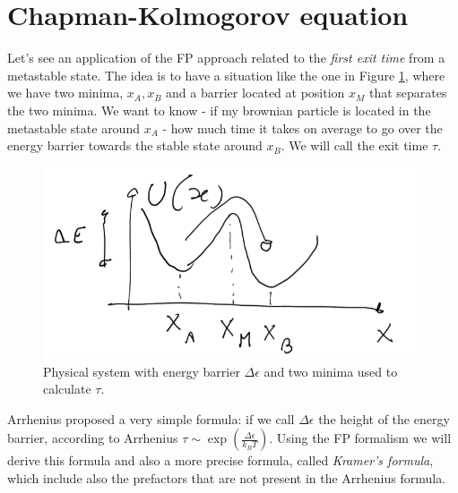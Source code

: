 \documentclass[\main/main.tex]{subfiles}
\begin{document}
\section{Chapman-Kolmogorov equation}
Let's see an application of the FP approach related to the \textit{first exit time} from a metastable state. The idea is to have a situation like the one in Figure \ref{fig:CK}, where we have two minima, $x_A, x_B$ and a barrier located at position $x_M$ that separates the two minima. We want to know - if my brownian particle is located in the metastable state around $x_A$ - how much time it takes on average to go over the energy barrier towards the stable state around $x_B$. We will call the exit time $\tau$.

\begin{figure}[h!]
   \centering
   \includegraphics[width=0.7\linewidth]{Lectures/Images/well.png}
   \caption{Physical system with energy barrier $\Delta\epsilon$ and two minima used to calculate $\tau$.}
   \label{fig:CK}
\end{figure}

Arrhenius proposed a very simple formula: if we call $\Delta\epsilon$ the height of the energy barrier, according to Arrhenius $\tau\sim\exp(\frac{\Delta\epsilon}{k_B T})$. Using the FP formalism we will derive this formula and also a more precise formula, called \textit{Kramer's formula}, which include also the prefactors that are not present in the Arrhenius formula. \\
\end{document}
